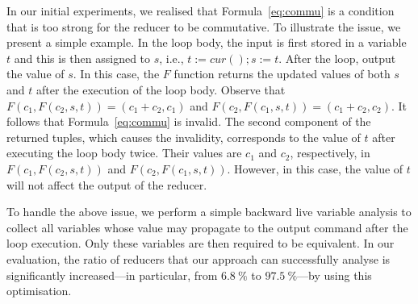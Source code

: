 \documentclass{llncs}
\newcommand{\cur}{cur()}
\begin{document}
In our initial experiments, we realised that Formula~\ref{eq:commu} is a
condition that is too strong for the reducer to be commutative. To illustrate
the issue, we present a simple example. In the loop body, the input is first
stored in a variable $t$ and this is then assigned to $s$, i.e., $t:=\cur;s:=t$.
After the loop, output the value of $s$. In this case, the $F$ function
returns the updated values of both $s$ and $t$ after the execution of the loop
body. Observe that $F(c_1, F(c_2,s,t)) = (c_1+c_2, c_1)$ and $F(c_2, F(c_1,s,t))
= (c_1+c_2, c_2)$. It follows that Formula~\ref{eq:commu} is invalid. The second
component of the returned tuples, which causes the invalidity, corresponds to
the value of $t$ after executing the loop body twice. Their values are $c_1$ and
$c_2$, respectively, in $F(c_1, F(c_2,s,t))$ and $F(c_2, F(c_1,s,t))$. However,
in this case, the value of $t$ will not affect the output of the reducer.

To handle the above issue, we perform a simple backward live variable analysis
to collect all variables whose value may propagate to the output command after
the loop execution. Only these variables are then required to be equivalent. In
our evaluation, the ratio of reducers that our approach can successfully analyse
is significantly increased---in particular, from $6.8~\%$ to $97.5~\%$---by
using this optimisation. 
\end{document}
